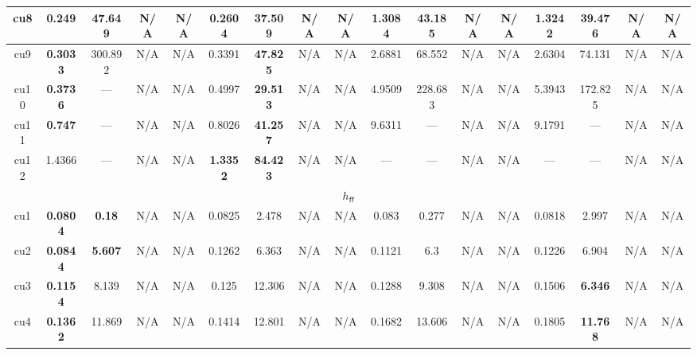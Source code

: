 \begin{tabular}{||c||c|c|c|c||c|c|c|c||c|c|c|c||c|c|c|c||}
\hline%
cu8&\small{\textbf{0.249}}&\small{47.649}&\small{N/A}&\small{N/A}&\small{0.2604}&\small{\textbf{37.509}}&\small{N/A}&\small{N/A}&\small{1.3084}&\small{43.185}&\small{N/A}&\small{N/A}&\small{1.3242}&\small{39.476}&\small{N/A}&\small{N/A}\\%
\hline%
cu9&\small{\textbf{0.3033}}&\small{300.892}&\small{N/A}&\small{N/A}&\small{0.3391}&\small{\textbf{47.825}}&\small{N/A}&\small{N/A}&\small{2.6881}&\small{68.552}&\small{N/A}&\small{N/A}&\small{2.6304}&\small{74.131}&\small{N/A}&\small{N/A}\\%
\hline%
cu10&\small{\textbf{0.3736}}&\small{---}&\small{N/A}&\small{N/A}&\small{0.4997}&\small{\textbf{29.513}}&\small{N/A}&\small{N/A}&\small{4.9509}&\small{228.683}&\small{N/A}&\small{N/A}&\small{5.3943}&\small{172.825}&\small{N/A}&\small{N/A}\\%
\hline%
cu11&\small{\textbf{0.747}}&\small{---}&\small{N/A}&\small{N/A}&\small{0.8026}&\small{\textbf{41.257}}&\small{N/A}&\small{N/A}&\small{9.6311}&\small{---}&\small{N/A}&\small{N/A}&\small{9.1791}&\small{---}&\small{N/A}&\small{N/A}\\%
\hline%
cu12&\small{1.4366}&\small{---}&\small{N/A}&\small{N/A}&\small{\textbf{1.3352}}&\small{\textbf{84.423}}&\small{N/A}&\small{N/A}&\small{---}&\small{---}&\small{N/A}&\small{N/A}&\small{---}&\small{---}&\small{N/A}&\small{N/A}\\%
\hline%
\multicolumn{17}{||c||}{$h_{\mathsf{ff}}$}\\%
\hline%
cu1&\small{\textbf{0.0804}}&\small{\textbf{0.18}}&\small{N/A}&\small{N/A}&\small{0.0825}&\small{2.478}&\small{N/A}&\small{N/A}&\small{0.083}&\small{0.277}&\small{N/A}&\small{N/A}&\small{0.0818}&\small{2.997}&\small{N/A}&\small{N/A}\\%
\hline%
cu2&\small{\textbf{0.0844}}&\small{\textbf{5.607}}&\small{N/A}&\small{N/A}&\small{0.1262}&\small{6.363}&\small{N/A}&\small{N/A}&\small{0.1121}&\small{6.3}&\small{N/A}&\small{N/A}&\small{0.1226}&\small{6.904}&\small{N/A}&\small{N/A}\\%
\hline%
cu3&\small{\textbf{0.1154}}&\small{8.139}&\small{N/A}&\small{N/A}&\small{0.125}&\small{12.306}&\small{N/A}&\small{N/A}&\small{0.1288}&\small{9.308}&\small{N/A}&\small{N/A}&\small{0.1506}&\small{\textbf{6.346}}&\small{N/A}&\small{N/A}\\%
\hline%
cu4&\small{\textbf{0.1362}}&\small{11.869}&\small{N/A}&\small{N/A}&\small{0.1414}&\small{12.801}&\small{N/A}&\small{N/A}&\small{0.1682}&\small{13.606}&\small{N/A}&\small{N/A}&\small{0.1805}&\small{\textbf{11.768}}&\small{N/A}&\small{N/A}\\%

\end{tabular}
